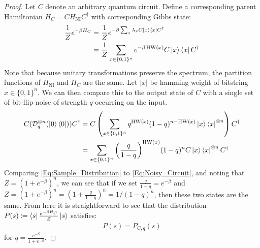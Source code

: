 \documentclass[10pt,a4paper]{amsart}
\newcommand{\HNI}{H_{\text{NI}}}
\DeclareMathOperator{\HW}{HW}
\newcommand{\cD}{\mathcal{D}}
\newcommand{\ox}{\otimes}
\begin{document}
	\begin{proof}
		Let $C$ denote an arbitrary quantum circuit.
		Define a corresponding parent Hamiltonian $H_C = C\HNI C^\dagger$ with corresponding Gibbs state:
		\begin{align}
			\frac{1}{Z}e^{-\beta H_C} &= \frac{1}{Z}e^{-\beta \sum_x \lambda_x C\ket{x}\bra{x}C^\dagger} \\
			&= \frac{1}{Z} \sum_{x\in \{0,1\}^n} e^{-\beta  \HW(x) }C\ket{x}\bra{x}C^\dagger \label{Eq:Sample_Distribution}
		\end{align} 
		Note that because unitary transformations preserve the spectrum, the partition functions of $\HNI$ and $H_C$ are the same. Let $|x|$ be hamming weight of bitstring $x \in \{0,1\}^n$.
        \noindent We can then compare this to the output state of $C$ with a single set of bit-flip noise of strength $q$ occurring on the input.
        \begin{align}
            C(\cD_q^{\ox n}(\ket{0}\bra{0}))C^\dagger &= C \left(\sum_{x \in \{0,1\}^n} q^{\HW(x)}(1-q)^{n-\HW(x)}\ket{x}\bra{x}^{\ox n} \right)C^\dagger  \\
            &= \sum_{x \in \{0,1\}^n} \bigg(\frac{q}{1-q}\bigg)^{\HW(x)}(1-q)^{n} C\ket{x}\bra{x}^{\ox n} C^\dagger \label{Eq:Noisy_Circuit}
        \end{align}
        Comparing \cref{Eq:Sample_Distribution} to \cref{Eq:Noisy_Circuit}, and noting that $Z = (1+e^{-\beta})^n$, we can see that if we set $\frac{q}{1-q} = e^{-\beta}$ and $Z = (1+e^{-\beta})^n = (1+\frac{q}{1-q})^n = 1/(1-q)^n$, then these two states are the same.
        From here it is straightforward to see that the distribution $ P(s) \coloneqq \bra{s}\frac{e^{-\beta H_C}}{Z}\ket{s}$ satisfies:
        \begin{align*}
            P(s) = P_{C, q }(s)  
        \end{align*}
        for  $q = \frac{e^{-\beta}}{1+e^{-\beta}}$.
	\end{proof}
\end{document}
